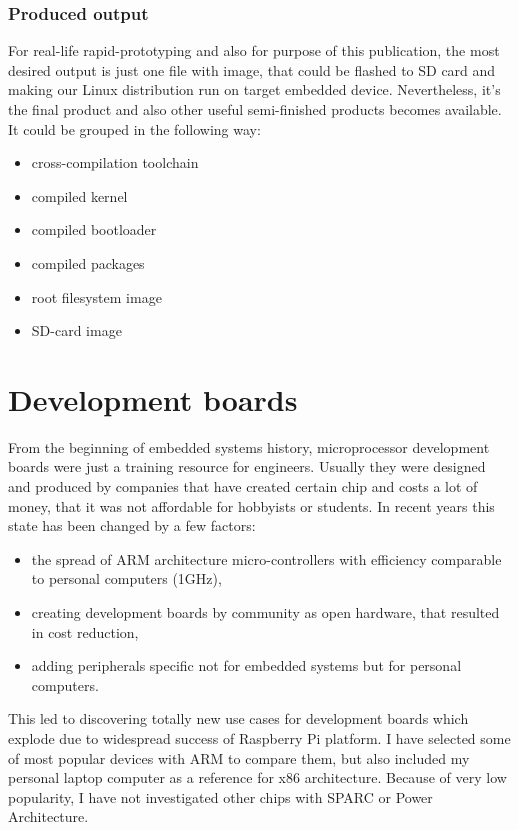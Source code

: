 \documentclass[printmode]{mgr}
\begin{document}
\subsection*{Produced output}

For real-life rapid-prototyping and also for purpose of this publication, the most desired output is just one file with image, that could be flashed to SD card and making our Linux distribution run on target embedded device. Nevertheless, it's the final product and also other useful semi-finished products becomes available. It could be grouped in the following way:

\begin{itemize}
    \item cross-compilation toolchain
    \item compiled kernel
    \item compiled bootloader
    \item compiled packages
    \item root filesystem image
    \item SD-card image
\end{itemize}



















\chapter{Development boards}
\label{section:development-boards}

From the beginning of embedded systems history, microprocessor development boards were just a training resource for engineers.
Usually they were designed and produced by companies that have created certain chip and costs a lot of money, that it was not affordable for hobbyists or students.
In recent years this state has been changed by a few factors:
\begin{itemize}
  \item the spread of ARM architecture micro-controllers with efficiency comparable to personal computers (1GHz),
  \item creating development boards by community as open hardware, that resulted in cost reduction,
  \item adding peripherals specific not for embedded systems but for personal computers.
\end{itemize}
This led to discovering totally new use cases for development boards which explode due to widespread success of Raspberry Pi platform.
I have selected some of most popular devices with ARM to compare them, but also included my personal laptop computer as a reference for x86 architecture. Because of very low popularity, I  have not investigated other chips with SPARC or Power Architecture.
\end{document}
